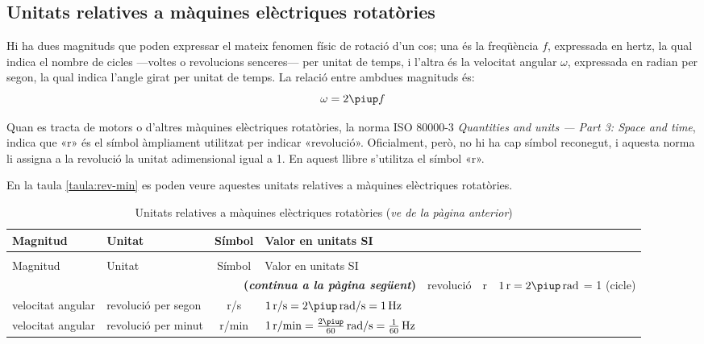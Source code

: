 \subsection{Unitats relatives a màquines elèctriques rotatòries}\label{sec:unit-maq-rotativ}

Hi ha dues magnituds que poden expressar el mateix fenomen físic de rotació d'un cos; una és la freqüència $f$, expressada en hertz, la qual indica el nombre de cicles ---voltes o revolucions senceres--- per unitat de temps, i l'altra és la velocitat angular $\omega$, expressada en radian per segon, la qual indica l'angle girat per unitat de temps. La relació entre ambdues magnituds és:
\begin{equation}
  \omega = 2 \piup f
\end{equation}

Quan es tracta de motors o d'altres màquines elèctriques rotatòries, la norma ISO 80000-3 \textit{Quantities and units --- Part 3: Space and time}, indica que «r» és el símbol àmpliament utilitzat per indicar  «revolució».  Oficialment, però, no hi ha cap símbol reconegut, i aquesta norma li assigna a la revolució la unitat  adimensional igual a 1. En aquest llibre s'utilitza el símbol «r».

En la taula \vref{taula:rev-min} es poden veure aquestes unitats relatives a màquines elèctriques rotatòries.

\begin{longtable}[h]{llcl}
   \caption{\label{taula:rev-min} Unitats relatives a màquines elèctriques rotatòries}\\
   \toprule[1pt]
    Magnitud & Unitat &  Símbol & Valor en unitats SI \\
   \midrule
   \endfirsthead
   \caption[]{Unitats relatives a màquines elèctriques rotatòries (\emph{ve de la pàgina anterior})}\\
   \toprule[1pt]
    Magnitud & Unitat &  Símbol & Valor en unitats SI \\
   \midrule
   \endhead
   \midrule
   \multicolumn{4}{r}{\sffamily\bfseries\color{NavyBlue}(\emph{continua a la pàgina següent})}
   \endfoot
   \endlastfoot
   angle pla & revolució &  \unit{r} & $\qty{1}{r} = 2\piup\unit{\,rad}$  = 1 (cicle)\\
   velocitat angular & revolució per segon &  \unit{r/s}& $\qty{1}{r/s} = 2\piup\unit{\,rad/s} = \qty{1}{Hz}$  \\
   velocitat angular & revolució per minut &  \unit{r/min}& $\qty{1}{r/min} = \frac{2\piup}{60}\unit{\,rad/s} = \frac{1}{60}\unit{\,Hz}$  \\
   \bottomrule[1pt]
\end{longtable}


